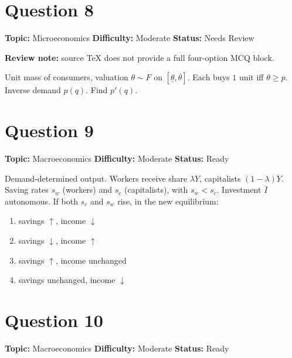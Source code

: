 \documentclass[11pt]{article}
\begin{document}
\newpage

\section*{Question 8}


\noindent\textbf{Topic:} Microeconomics \quad \textbf{Difficulty:} Moderate \quad \textbf{Status:} Needs Review

\par\noindent\textcolor{StatAmber}{\textbf{Review note:} source TeX does not provide a full four-option MCQ block.}


Unit mass of consumers, valuation $\theta\sim F$ on $[\underline\theta,\overline\theta]$. Each buys $1$ unit iff $\theta\ge p$. Inverse demand $p(q)$. Find $p'(q)$.

\newpage

\section*{Question 9}


\noindent\textbf{Topic:} Macroeconomics \quad \textbf{Difficulty:} Moderate \quad \textbf{Status:} Ready



Demand-determined output. Workers receive share $\lambda Y$, capitalists $(1-\lambda)Y$. Saving rates $s_w$ (workers) and $s_c$ (capitalists), with $s_w<s_c$. Investment $\bar I$ autonomous. If both $s_c$ and $s_w$ rise, in the new equilibrium:
\begin{enumerate}[label=(\Alph*)]
\item savings $\uparrow$, income $\downarrow$
\item savings $\downarrow$, income $\uparrow$
\item savings $\uparrow$, income unchanged
\item savings unchanged, income $\downarrow$
\end{enumerate}

\newpage

\section*{Question 10}


\noindent\textbf{Topic:} Macroeconomics \quad \textbf{Difficulty:} Moderate \quad \textbf{Status:} Ready
\end{document}
